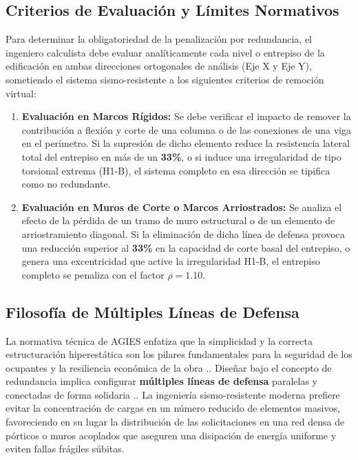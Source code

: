 \documentclass[14pt,letterpaper]{extarticle}
\begin{document}
	\subsection{Criterios de Evaluación y Límites Normativos}
	Para determinar la obligatoriedad de la penalización por redundancia, el ingeniero calculista debe evaluar analíticamente cada nivel o entrepiso de la edificación en ambas direcciones ortogonales de análisis (Eje X y Eje Y), sometiendo el sistema sismo-resistente a los siguientes criterios de remoción virtual:
	
	\begin{enumerate}
		\item \textbf{Evaluación en Marcos Rígidos:} Se debe verificar el impacto de remover la contribución a flexión y corte de una columna o de las conexiones de una viga en el perímetro. Si la supresión de dicho elemento reduce la resistencia lateral total del entrepiso en más de un \textbf{33\%}, o si induce una irregularidad de tipo torsional extrema (H1-B), el sistema completo en esa dirección se tipifica como no redundante.
		\item \textbf{Evaluación en Muros de Corte o Marcos Arriostrados:} Se analiza el efecto de la pérdida de un tramo de muro estructural o de un elemento de arriostramiento diagonal. Si la eliminación de dicha línea de defensa provoca una reducción superior al \textbf{33\%} en la capacidad de corte basal del entrepiso, o genera una excentricidad que active la irregularidad H1-B, el entrepiso completo se penaliza con el factor $\rho = 1.10$.
	\end{enumerate}
	
	\subsection{Filosofía de Múltiples Líneas de Defensa}
	La normativa técnica de AGIES enfatiza que la simplicidad y la correcta estructuración hiperestática son los pilares fundamentales para la seguridad de los ocupantes y la resiliencia económica de la obra .. Diseñar bajo el concepto de redundancia implica configurar \textbf{múltiples líneas de defensa} paralelas y conectadas de forma solidaria .. La ingeniería sismo-resistente moderna prefiere evitar la concentración de cargas en un número reducido de elementos masivos, favoreciendo en su lugar la distribución de las solicitaciones en una red densa de pórticos o muros acoplados que aseguren una disipación de energía uniforme y eviten fallas frágiles súbitas.
	
\end{document}
